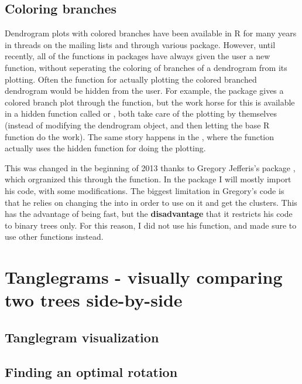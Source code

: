 \documentclass[shortnames,nojss,article]{jss}\usepackage{graphicx, color}
\begin{document}
\subsection{Coloring branches}


Dendrogram plots with colored branches have been available in R for many years in threads on the mailing lists and through various package. However, until recently, all of the functions in packages have always given the user a new  function, without seperating the coloring of branches of a dendrogram from its plotting. Often the function for actually plotting the colored branched dendrogram would be hidden from the user. For example, the  package \citep{CRAN:labeltodendro} gives a colored branch plot through the  function, but the work horse for this is available in a hidden function called  or , both take care of the plotting by themselves (instead of modifying the dendrogram object, and then letting the base R function do the work). The same story happens in the  \citep{CRAN:Heatplus}, where the  function actually uses the hidden function  for doing the plotting.

This was changed in the beginning of 2013 thanks to Gregory Jefferis's  package \citep{CRAN:dendroextras}, which orgranized this through the  function. In the  package I will mostly import his code, with some modifications. The biggest limitation in Gregory's code is that he relies on changing the  into  in order to use  on it and get the clusters. This has the advantage of being fast, but the \textbf{disadvantage} that it restricts his code to binary trees only. For this reason, I did not use his  function, and made sure to use other functions instead.






\section{Tanglegrams - visually comparing two trees side-by-side}

\subsection{Tanglegram visualization}

\subsection{Finding an optimal rotation}
\end{document}
